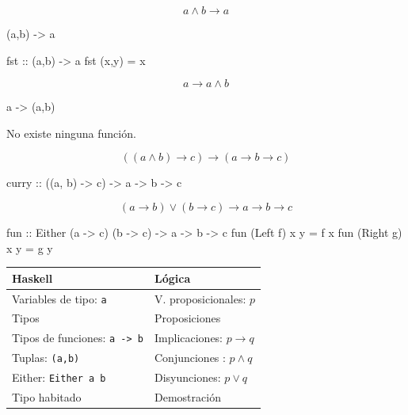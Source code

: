 \documentclass{beamer}
\begin{document}
\begin{frame}[fragile]
  $$a \wedge b \rightarrow a $$
\pause

\begin{sesion}  
(a,b) -> a
\end{sesion}

\pause

\begin{code}
fst :: (a,b) -> a
fst (x,y) = x
\end{code}

\end{frame}

\begin{frame}[fragile]
  $$a \rightarrow a\wedge b $$

\pause
\begin{sesion}
a -> (a,b)
\end{sesion}
  
\pause
No existe ninguna función.
\end{frame}

\begin{frame}[fragile]
  $$((a\wedge b) \rightarrow c) \rightarrow (a \rightarrow b \rightarrow c) $$

  \pause
  
\begin{code}
curry :: ((a, b) -> c) -> a -> b -> c  
\end{code}
\end{frame}

\begin{frame}[fragile]
  $$(a\rightarrow b) \vee (b\rightarrow c) \rightarrow a \rightarrow b \rightarrow c  $$

  \pause
  
\begin{code}
fun :: Either (a -> c) (b -> c) -> a -> b -> c
fun (Left f)  x y = f x
fun (Right g) x y = g y
\end{code}
\end{frame}

\begin{frame}
\begin{table}[htbp]
\begin{center}
\begin{tabular}{|l|l|}
\hline
Haskell & Lógica \\
\hline \hline
Variables de tipo:  \texttt{a} & V. proposicionales: $p$  \\ \hline
Tipos & Proposiciones \\ \hline
Tipos de funciones: \texttt{a -> b} & Implicaciones: $p\rightarrow q$ \\ \hline
Tuplas: \texttt{(a,b)} & Conjunciones : $p\wedge q$ \\ \hline
Either: \texttt{Either a b} & Disyunciones: $p\vee q$ \\ \hline  
Tipo habitado & Demostración \\ \hline  
\end{tabular}
\end{center}
\end{table}
  

\end{frame}
\end{document}
